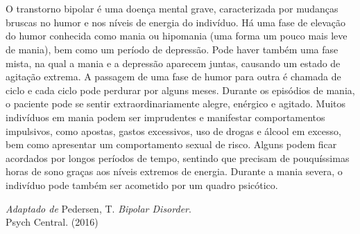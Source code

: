 
\chapter*{}

\epigraph{%
O transtorno bipolar é uma doença mental grave, caracterizada por mudanças 
bruscas no humor e nos níveis de energia do indivíduo. Há uma fase de elevação 
do humor conhecida como mania ou hipomania (uma forma um pouco mais leve de mania), 
bem como um período de depressão. Pode haver também uma fase mista, na qual a mania 
e a depressão aparecem juntas, causando um estado de agitação extrema. A passagem 
de uma fase de humor para outra é chamada de ciclo e cada ciclo pode perdurar por alguns meses.
Durante os episódios de mania, o paciente pode se sentir extraordinariamente alegre, 
enérgico e agitado. Muitos indivíduos em mania podem ser imprudentes e manifestar comportamentos 
impulsivos, como apostas, gastos excessivos, uso de drogas e álcool em excesso, bem como 
apresentar um comportamento sexual de risco. Alguns podem ficar acordados por longos períodos de 
tempo, sentindo que precisam de pouquíssimas horas de sono graças aos níveis extremos de energia. 
Durante a mania severa, o indivíduo pode também ser acometido por um quadro psicótico.
}{\emph{Adaptado de} Pedersen, T. \emph{Bipolar Disorder}.\\ Psych Central. (2016)}

\thispagestyle{empty}


%
%
%

